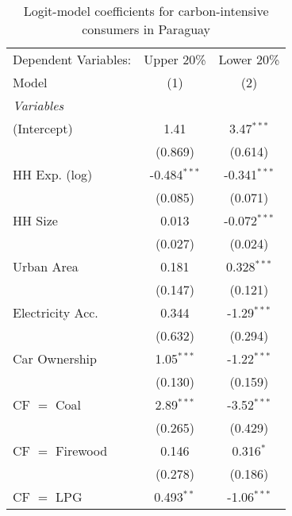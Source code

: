 
\begin{table}[htbp!]
   \centering
   \small
   \begin{adjustbox}{width = 1\textwidth, max height = 0.95\textheight, center}
      \begin{threeparttable}[b]
         \caption{\label{tab:Logit_1_PRY} Logit-model coefficients for carbon-intensive consumers in Paraguay}
         \begin{tabular}{lcc}
            \tabularnewline \midrule \midrule
            Dependent Variables: & Upper 20\%     & Lower 20\%\\   
            Model                & (1)            & (2)\\  
            \midrule
            \emph{Variables}\\
            (Intercept)          & 1.41           & 3.47$^{***}$\\   
                                 & (0.869)        & (0.614)\\   
            HH Exp. (log)        & -0.484$^{***}$ & -0.341$^{***}$\\   
                                 & (0.085)        & (0.071)\\   
            HH Size              & 0.013          & -0.072$^{***}$\\   
                                 & (0.027)        & (0.024)\\   
            Urban Area           & 0.181          & 0.328$^{***}$\\   
                                 & (0.147)        & (0.121)\\   
            Electricity Acc.     & 0.344          & -1.29$^{***}$\\   
                                 & (0.632)        & (0.294)\\   
            Car Ownership        & 1.05$^{***}$   & -1.22$^{***}$\\   
                                 & (0.130)        & (0.159)\\   
            CF $=$ Coal          & 2.89$^{***}$   & -3.52$^{***}$\\   
                                 & (0.265)        & (0.429)\\   
            CF $=$ Firewood      & 0.146          & 0.316$^{*}$\\   
                                 & (0.278)        & (0.186)\\   
            CF $=$ LPG           & 0.493$^{**}$   & -1.06$^{***}$\\   

\end{tabular}
\end{threeparttable}
\end{adjustbox}
\end{table}

